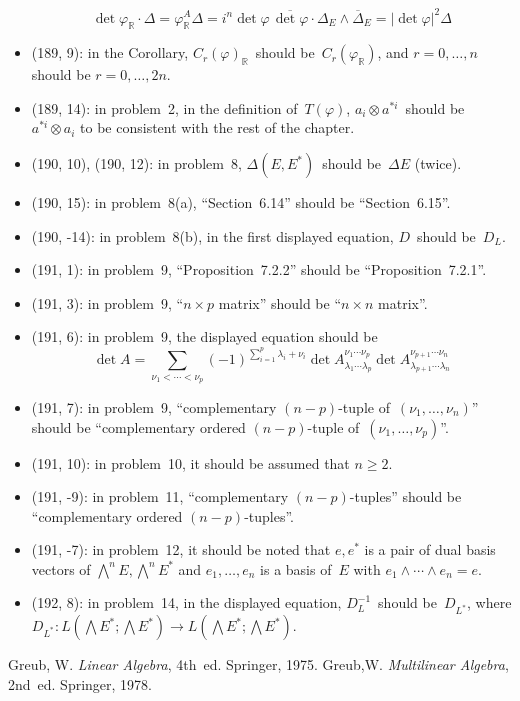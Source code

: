 \documentclass[letterpaper,12pt]{article}
\newcommand{\R}{\mathbb{R}}
\newcommand{\mult}{\cdot}
\newcommand{\tprod}{\otimes}
\newcommand{\eprod}{\wedge}
\newcommand{\bigeprod}{\bigwedge}
\newcommand{\abs}[1]{|#1|}
\newcommand{\conj}[1]{\overline{#1}}
\begin{document}
\begin{itemize}
\[\det\varphi_{\R}\mult\Delta=\varphi_{\R}^A\Delta=i^n\det\varphi\,\conj{\det\varphi}\mult\Delta_E\eprod\conj{\Delta}_E=\abs{\det\varphi}^2\Delta\]
\item (189, 9): in the Corollary, \(C_r(\varphi)_{\R}\)~should be~\(C_r(\varphi_{\R})\), and \(r=0,\ldots,n\) should be \(r=0,\ldots,2n\).
\item (189, 14): in problem~2, in the definition of~\(T(\varphi)\), \(a_i\tprod a^{*i}\)~should be~\(a^{*i}\tprod a_i\) to be consistent with the rest of the chapter.
\item (190, 10), (190, 12): in problem~8, \(\Delta(E,E^*)\)~should be~\(\Delta E\) (twice).
\item (190, 15): in problem~8(a), ``Section~6.14'' should be ``Section~6.15''.
\item (190, -14): in problem~8(b), in the first displayed equation, \(D\)~should be~\(D_L\).
\item (191, 1): in problem~9, ``Proposition~7.2.2'' should be ``Proposition~7.2.1''.
\item (191, 3): in problem~9, ``\(n\times p\) matrix'' should be ``\(n\times n\) matrix''.
\item (191, 6): in problem~9, the displayed equation should be
\[\det A=\sum_{\nu_1<\cdots<\nu_p}(-1)^{\sum_{i=1}^p\lambda_i+\nu_i}\det A_{\lambda_1\cdots\lambda_p}^{\nu_1\cdots\nu_p}\det A_{\lambda_{p+1}\cdots\lambda_n}^{\nu_{p+1}\cdots\nu_n}\]
\item (191, 7): in problem~9, ``complementary \((n-p)\)-tuple of~\((\nu_1,\ldots,\nu_n)\)'' should be ``complementary ordered \((n-p)\)-tuple of~\((\nu_1,\ldots,\nu_p)\)''.
\item (191, 10): in problem~10, it should be assumed that \(n\ge 2\).
\item (191, -9): in problem~11, ``complementary \((n-p)\)-tuples'' should be ``complementary ordered \((n-p)\)-tuples''.
\item (191, -7): in problem~12, it should be noted that \(e,e^*\) is a pair of dual basis vectors of \(\bigeprod^n E,\bigeprod^n E^*\) and \(e_1,\ldots,e_n\) is a basis of~\(E\) with \(e_1\eprod\cdots\eprod e_n=e\).
\item (192, 8): in problem~14, in the displayed equation, \(D_L^{-1}\)~should be~\(D_{L^*}\), where \(D_{L^*}:L(\bigeprod E^*;\bigeprod E^*)\to L(\bigeprod E^*;\bigeprod E^*)\).
\end{itemize}

\begin{thebibliography}{0}
 Greub, W. \textit{Linear Algebra}, 4th~ed. Springer, 1975.
 Greub,W. \textit{Multilinear Algebra}, 2nd~ed. Springer, 1978.
\end{thebibliography}
\end{document}
